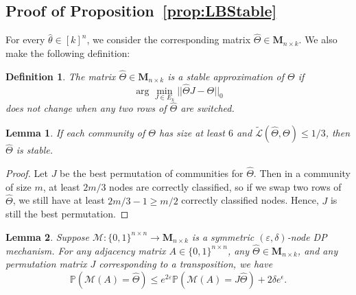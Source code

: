 \documentclass{article}
\newtheorem{definition}{Definition}
\newtheorem{lemma}{Lemma}
\newcommand{\eps}{\varepsilon}
\newcommand{\calM}{\mathcal{M}}
\begin{document}
\subsection{Proof of Proposition~\ref{prop:LBStable}}
\label{AppPropStable}

For every $\hat{\theta} \in [k]^n$, we consider the corresponding matrix $\hat{\Theta} \in \mathbf{M}_{n \times k}$. We also make the following definition:

\begin{definition}
\label{def_stable}
The matrix $\hat\Theta\in\mathbf{M}_{n\times k}$ is a \textit{stable approximation} of $\Theta$ if 
$$ \arg\min_{J\in E_k} || \hat\Theta J - \Theta||_0
$$
does not change when any two rows of $\hat\Theta$ are switched.
\end{definition}

\begin{lemma}
\label{LemStable}
If each community of $\Theta$ has size at least $6$ and $\widetilde{\mathcal{L}}(\hat{\Theta}, \Theta) \leq 1/3$, then $\hat\Theta$ is stable.
\end{lemma}

\begin{proof}
Let $J$ be the best permutation of communities for $\hat\Theta$. Then in a community of size $m$, at least $2m/3$ nodes are correctly classified, so if we swap two rows of $\hat\Theta$, we still have at least $2m/3-1 \geq m/2$ correctly classified nodes. Hence, $J$ is still the best permutation.
\end{proof}

\begin{lemma}
\label{LemPerm}
Suppose $\calM: \{0,1\}^{n\times n}\to \mathbf{M}_{n\times k}$ is a symmetric $(\eps, \delta)$-node DP mechanism. For any adjacency matrix $A\in \{0,1\}^{n\times n}$, any $\hat\Theta\in \mathbf{M}_{n\times k}$, and any permutation matrix $J$ corresponding to a transposition, we have
$$\mathbb{P}(\calM(A) = \hat{\Theta}) \leq e^{2\eps} \mathbb{P}(\calM(A)=J\hat{\Theta}) + 2\delta e^{\epsilon}.
$$
\end{lemma}
\end{document}
